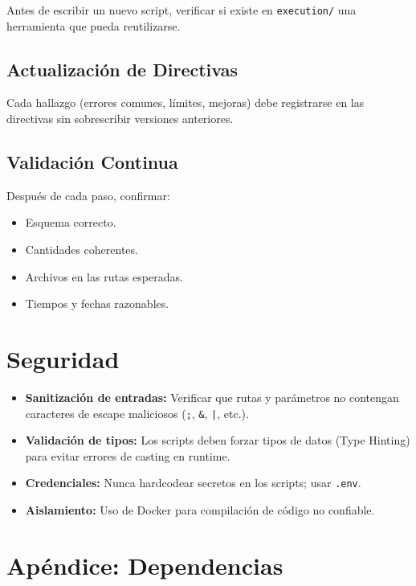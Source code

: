\documentclass[a4paper,12pt]{article}
\begin{document}
Antes de escribir un nuevo script, verificar si existe en \texttt{execution/} una herramienta que pueda reutilizarse.

\subsection{Actualización de Directivas}

Cada hallazgo (errores comunes, límites, mejoras) debe registrarse en las directivas sin sobrescribir versiones anteriores.

\subsection{Validación Continua}

Después de cada paso, confirmar:
\begin{itemize}
    \item Esquema correcto.
    \item Cantidades coherentes.
    \item Archivos en las rutas esperadas.
    \item Tiempos y fechas razonables.
\end{itemize}

\section{Seguridad}

\begin{itemize}
    \item \textbf{Sanitización de entradas:} Verificar que rutas y parámetros no contengan caracteres de escape maliciosos (\texttt{;}, \texttt{\&}, \texttt{|}, etc.).
    \item \textbf{Validación de tipos:} Los scripts deben forzar tipos de datos (Type Hinting) para evitar errores de casting en runtime.
    \item \textbf{Credenciales:} Nunca hardcodear secretos en los scripts; usar \texttt{.env}.
    \item \textbf{Aislamiento:} Uso de Docker para compilación de código no confiable.
\end{itemize}

\section{Apéndice: Dependencias}
\end{document}
